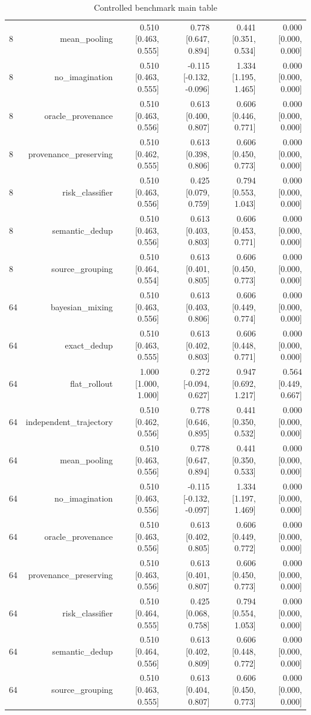 \documentclass[10pt]{article}
\begin{document}
\begin{table}[t]
\begin{tabularx}{\linewidth}{Yrrrrr}
8 & mean\_pooling & 0.510 [0.463, 0.555] & 0.778 [0.647, 0.894] & 0.441 [0.351, 0.534] & 0.000 [0.000, 0.000] \\
8 & no\_imagination & 0.510 [0.463, 0.555] & -0.115 [-0.132, -0.096] & 1.334 [1.195, 1.465] & 0.000 [0.000, 0.000] \\
8 & oracle\_provenance & 0.510 [0.463, 0.556] & 0.613 [0.400, 0.807] & 0.606 [0.446, 0.771] & 0.000 [0.000, 0.000] \\
8 & provenance\_preserving & 0.510 [0.462, 0.555] & 0.613 [0.398, 0.806] & 0.606 [0.450, 0.773] & 0.000 [0.000, 0.000] \\
8 & risk\_classifier & 0.510 [0.463, 0.556] & 0.425 [0.079, 0.759] & 0.794 [0.553, 1.043] & 0.000 [0.000, 0.000] \\
8 & semantic\_dedup & 0.510 [0.463, 0.556] & 0.613 [0.403, 0.803] & 0.606 [0.453, 0.771] & 0.000 [0.000, 0.000] \\
8 & source\_grouping & 0.510 [0.464, 0.554] & 0.613 [0.401, 0.805] & 0.606 [0.450, 0.773] & 0.000 [0.000, 0.000] \\
64 & bayesian\_mixing & 0.510 [0.463, 0.556] & 0.613 [0.403, 0.806] & 0.606 [0.449, 0.774] & 0.000 [0.000, 0.000] \\
64 & exact\_dedup & 0.510 [0.463, 0.555] & 0.613 [0.402, 0.803] & 0.606 [0.448, 0.771] & 0.000 [0.000, 0.000] \\
64 & flat\_rollout & 1.000 [1.000, 1.000] & 0.272 [-0.094, 0.627] & 0.947 [0.692, 1.217] & 0.564 [0.449, 0.667] \\
64 & independent\_trajectory & 0.510 [0.462, 0.556] & 0.778 [0.646, 0.895] & 0.441 [0.350, 0.532] & 0.000 [0.000, 0.000] \\
64 & mean\_pooling & 0.510 [0.463, 0.556] & 0.778 [0.647, 0.894] & 0.441 [0.350, 0.533] & 0.000 [0.000, 0.000] \\
64 & no\_imagination & 0.510 [0.463, 0.556] & -0.115 [-0.132, -0.097] & 1.334 [1.197, 1.469] & 0.000 [0.000, 0.000] \\
64 & oracle\_provenance & 0.510 [0.463, 0.556] & 0.613 [0.402, 0.805] & 0.606 [0.449, 0.772] & 0.000 [0.000, 0.000] \\
64 & provenance\_preserving & 0.510 [0.463, 0.556] & 0.613 [0.401, 0.807] & 0.606 [0.450, 0.773] & 0.000 [0.000, 0.000] \\
64 & risk\_classifier & 0.510 [0.464, 0.555] & 0.425 [0.068, 0.758] & 0.794 [0.554, 1.053] & 0.000 [0.000, 0.000] \\
64 & semantic\_dedup & 0.510 [0.464, 0.556] & 0.613 [0.402, 0.809] & 0.606 [0.448, 0.772] & 0.000 [0.000, 0.000] \\
64 & source\_grouping & 0.510 [0.463, 0.555] & 0.613 [0.404, 0.807] & 0.606 [0.450, 0.773] & 0.000 [0.000, 0.000] \\
\bottomrule
\end{tabularx}
\caption{Controlled benchmark main table}
\end{table}
\end{document}
